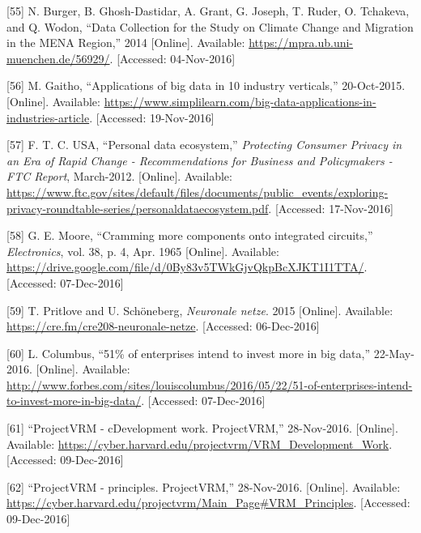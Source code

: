 \documentclass[12pt,english,a4paper,titlepage,cleardoublepage=empty,dottedtoc]{report}
\begin{document}
\hypertarget{ref-data-collection-for-climate-changes_2014}{}
{[}55{]} N. Burger, B. Ghosh-Dastidar, A. Grant, G. Joseph, T. Ruder, O.
Tchakeva, and Q. Wodon, ``Data Collection for the Study on Climate
Change and Migration in the MENA Region,'' 2014 {[}Online{]}. Available:
\url{https://mpra.ub.uni-muenchen.de/56929/}. {[}Accessed:
04-Nov-2016{]}

\hypertarget{ref-graphic_2015_applications-of-big-data-in-10-industry-verticals}{}
{[}56{]} M. Gaitho, ``Applications of big data in 10 industry
verticals,'' 20-Oct-2015. {[}Online{]}. Available:
\url{https://www.simplilearn.com/big-data-applications-in-industries-article}.
{[}Accessed: 19-Nov-2016{]}

\hypertarget{ref-graphic_2012_personal-data-ecosystem}{}
{[}57{]} F. T. C. USA, ``Personal data ecosystem,'' \emph{Protecting
Consumer Privacy in an Era of Rapid Change - Recommendations for
Business and Policymakers - FTC Report}, March-2012. {[}Online{]}.
Available:
\url{https://www.ftc.gov/sites/default/files/documents/public_events/exploring-privacy-roundtable-series/personaldataecosystem.pdf}.
{[}Accessed: 17-Nov-2016{]}

\hypertarget{ref-paper_1965_moors-law}{}
{[}58{]} G. E. Moore, ``Cramming more components onto integrated
circuits,'' \emph{Electronics}, vol. 38, p. 4, Apr. 1965 {[}Online{]}.
Available:
\url{https://drive.google.com/file/d/0By83v5TWkGjvQkpBcXJKT1I1TTA/}.
{[}Accessed: 07-Dec-2016{]}

\hypertarget{ref-podcast_2015_cre-neuronale-netze}{}
{[}59{]} T. Pritlove and U. Schöneberg, \emph{Neuronale netze}. 2015
{[}Online{]}. Available: \url{https://cre.fm/cre208-neuronale-netze}.
{[}Accessed: 06-Dec-2016{]}

\hypertarget{ref-web_2016_industries-intention-to-invest-in-big-data}{}
{[}60{]} L. Columbus, ``51\% of enterprises intend to invest more in big
data,'' 22-May-2016. {[}Online{]}. Available:
\url{http://www.forbes.com/sites/louiscolumbus/2016/05/22/51-of-enterprises-intend-to-invest-more-in-big-data/}.
{[}Accessed: 07-Dec-2016{]}

\hypertarget{ref-web_2016_projectvrm_development-work}{}
{[}61{]} ``ProjectVRM - cDevelopment work. ProjectVRM,'' 28-Nov-2016.
{[}Online{]}. Available:
\url{https://cyber.harvard.edu/projectvrm/VRM_Development_Work}.
{[}Accessed: 09-Dec-2016{]}

\hypertarget{ref-web_2016_projectvrm_principles}{}
{[}62{]} ``ProjectVRM - principles. ProjectVRM,'' 28-Nov-2016.
{[}Online{]}. Available:
\url{https://cyber.harvard.edu/projectvrm/Main_Page\#VRM_Principles}.
{[}Accessed: 09-Dec-2016{]}
\end{document}
